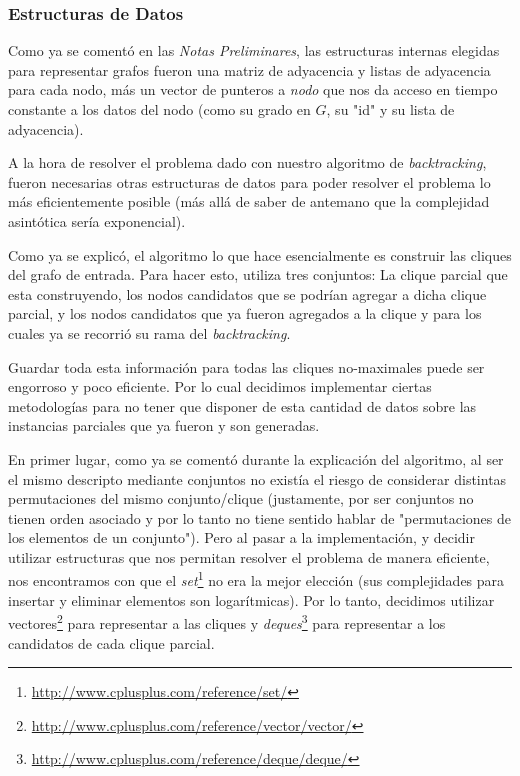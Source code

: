 \subsubsection{Estructuras de Datos}
\par Como ya se coment\'o en las \emph{Notas Preliminares}, las estructuras internas
    elegidas para representar grafos fueron una matriz de adyacencia y listas
    de adyacencia para cada nodo, m\'as un vector de punteros a \emph{nodo}
    que nos da acceso en tiempo constante a los datos del nodo (como su grado en $G$,
    su "id" y su lista de adyacencia).

\par A la hora de resolver el problema dado con nuestro algoritmo de \emph{backtracking},
    fueron necesarias otras estructuras de datos para poder resolver el problema
    lo m\'as eficientemente posible (m\'as all\'a de saber de antemano que la complejidad
    asint\'otica ser\'ia exponencial).

\par Como ya se explic\'o, el algoritmo lo que hace esencialmente es construir las cliques
    del grafo de entrada. Para hacer esto, utiliza tres conjuntos: La clique parcial que
    esta construyendo, los nodos candidatos que se podr\'ian agregar a dicha clique parcial,
    y los nodos candidatos que ya fueron agregados a la clique y para los cuales ya
    se recorri\'o su rama del \emph{backtracking}.

\par Guardar toda esta informaci\'on para todas las cliques no-maximales puede ser engorroso
    y poco eficiente. Por lo cual decidimos implementar ciertas metodolog\'ias para
    no tener que disponer de esta cantidad de datos sobre las instancias parciales
    que ya fueron y son generadas.

\par En primer lugar, como ya se coment\'o durante la explicaci\'on del algoritmo, al ser
    el mismo descripto mediante conjuntos no exist\'ia el riesgo de considerar distintas
    permutaciones del mismo conjunto/clique (justamente, por ser conjuntos no tienen orden
    asociado y por lo tanto no tiene sentido hablar de "permutaciones de los elementos
    de un conjunto"). Pero al pasar a la implementaci\'on, y decidir utilizar estructuras
    que nos permitan resolver el problema de manera eficiente, nos encontramos con que
    el \emph{set}\footnote{\url{http://www.cplusplus.com/reference/set/}} no era la mejor
    elecci\'on (sus complejidades para insertar y eliminar elementos son logar\'itmicas).
    Por lo tanto, decidimos utilizar vectores\footnote{\url{http://www.cplusplus.com/reference/vector/vector/}}
    para representar a las cliques y \emph{deques}\footnote{\url{http://www.cplusplus.com/reference/deque/deque/}}
    para representar a los candidatos de cada clique parcial.

